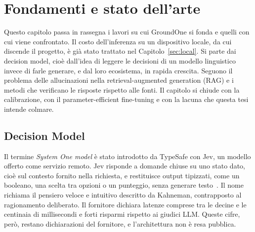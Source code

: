 \chapter{Fondamenti e stato dell'arte}
\label{sec:background}


Questo capitolo passa in rassegna i lavori su cui GroundOne si fonda e quelli con cui viene confrontato. Il costo
dell'inferenza su un dispositivo locale, da cui discende il progetto, è già stato trattato nel Capitolo~\ref{sec:local}.
Si parte dai decision model, cioè dall'idea di leggere le decisioni di un modello linguistico invece di farle
generare, e dal loro ecosistema, in rapida crescita. Seguono il problema delle allucinazioni nella
retrieval-augmented generation (RAG) e i metodi che verificano le risposte rispetto alle fonti. Il capitolo si chiude con
la calibrazione, con il parameter-efficient fine-tuning e con la lacuna che questa tesi intende colmare.

\section{Decision Model}
\label{sec:bg-systemone}

Il termine \emph{System One model} è stato introdotto da TypeSafe con Jev, un modello offerto come servizio remoto. Jev
risponde a domande chiuse su uno stato dato, cioè sul contesto fornito nella richiesta, e restituisce output tipizzati,
come un booleano, una scelta tra opzioni o un punteggio, senza generare testo~\cite{typesafe2026jev}. Il nome richiama il
pensiero veloce e intuitivo descritto da Kahneman, contrapposto al ragionamento deliberato. Il fornitore dichiara latenze
comprese tra le decine e le centinaia di millisecondi e forti risparmi rispetto ai giudici LLM. Queste cifre,
però, restano dichiarazioni del fornitore, e l'architettura non è resa pubblica.

